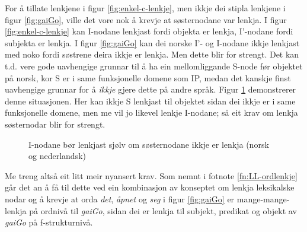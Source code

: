 \documentclass[12pt,a4paper,oneside,draft]{report}
\newcommand{\proj}[2]{\begin{tabular}{c}\footnotesize{#1}\\\normalsize{#2}\end{tabular}}
\newcommand{\ua}{\ensuremath{\uparrow}}
\newcommand{\da}{\ensuremath{\downarrow}}
\begin{document}
For å tillate lenkjene i figur \ref{fig:enkel-c-lenkje}, men ikkje dei
 stipla lenkjene i figur \ref{fig:gaiGo}, ville det vore nok å krevje
 at søsternodane var lenkja. I figur \ref{fig:enkel-c-lenkje} kan
 I-nodane lenkjast fordi objekta er lenkja, I'-nodane fordi subjekta
 er lenkja. I figur \ref{fig:gaiGo} kan dei norske I'- og I-nodane
 ikkje lenkjast med noko fordi søstrene deira ikkje er lenkja.  Men
 dette blir for strengt. Det kan t.d. vere gode uavhengige grunnar til
 å ha ein mellomliggande S-node før objektet på norsk, kor S er i same
 funksjonelle domene som IP, medan det kanskje finst uavhengige
 grunnar for å \emph{ikkje} gjere dette på andre språk. Figur
 \ref{fig:enkel-c-lenkje-med-S} demonstrerer denne situasjonen. Her
 kan ikkje S lenkjast til objektet sidan dei ikkje er i same
 funksjonelle domene, men me vil jo likevel lenkje I-nodane; så eit
 krav om lenkja søsternodar blir for strengt.

\begin{figure}[htp]
\centering
   \caption{I-nodane bør lenkjast sjølv om søsternodane ikkje er
   lenkja (norsk og nederlandsk)}
   \label{fig:enkel-c-lenkje-med-S}
  \end{figure}

Me treng altså eit litt meir nyansert krav. Som nemnt i fotnote
\ref{fn:LL-ordlenkje} går det an å få til dette ved ein kombinasjon av
konseptet om lenkja leksikalske nodar og å krevje at orda \emph{det},
 \emph{åpnet} og \emph{seg} i figur \ref{fig:gaiGo} er mange-mange-lenkja på
ordnivå til \emph{gaiGo}, sidan dei er lenkja til subjekt, predikat og
objekt av \emph{gaiGo} på f-strukturnivå. 
\end{document}
